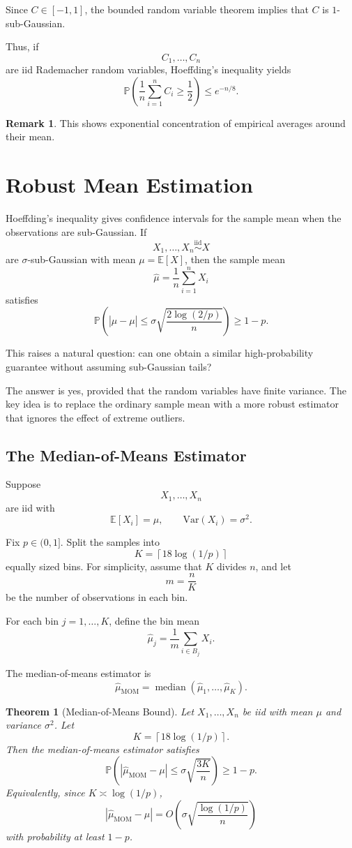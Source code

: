 \documentclass[12pt,oneside]{book}
\numberwithin{equation}{section}
\theoremstyle{definition}
\newtheorem{remark}{Remark}[section]
\theoremstyle{plain}
\newtheorem{theorem}{Theorem}[section]
\theoremstyle{remark}
\newcommand{\E}{\mathbb{E}}
\newcommand{\Var}{\mathrm{Var}}
\newcommand{\Prob}{\mathbb{P}}
\newcommand{\iid}{\overset{\text{iid}}{\sim}}
\begin{document}
Since $C\in[-1,1]$, the bounded random variable theorem implies that $C$ is $1$-sub-Gaussian.

Thus, if
\[
C_1,\dots,C_n
\]
are iid Rademacher random variables, Hoeffding's inequality yields
\[
\Prob\left(
\frac{1}{n}\sum_{i=1}^n C_i
\geq
\frac12
\right)
\leq
e^{-n/8}.
\]

\begin{remark}
This shows exponential concentration of empirical averages around their mean.
\end{remark}

\section{Robust Mean Estimation}

Hoeffding's inequality gives confidence intervals for the sample mean when the observations are sub-Gaussian. If
\[
X_1,\dots,X_n \iid X
\]
are $\sigma$-sub-Gaussian with mean $\mu=\E[X]$, then the sample mean
\[
\widehat{\mu}
=
\frac{1}{n}\sum_{i=1}^n X_i
\]
satisfies
\[
\Prob\left(
|\widehat{\mu}-\mu|
\leq
\sigma\sqrt{\frac{2\log(2/p)}{n}}
\right)
\geq
1-p.
\]

This raises a natural question: can one obtain a similar high-probability guarantee without assuming sub-Gaussian tails?

The answer is yes, provided that the random variables have finite variance. The key idea is to replace the ordinary sample mean with a more robust estimator that ignores the effect of extreme outliers.

\subsection{The Median-of-Means Estimator}

Suppose
\[
X_1,\dots,X_n
\]
are iid with
\[
\E[X_i]=\mu,
\qquad
\Var(X_i)=\sigma^2.
\]

Fix $p\in(0,1]$. Split the samples into
\[
K=\left\lceil 18\log(1/p)\right\rceil
\]
equally sized bins. For simplicity, assume that $K$ divides $n$, and let
\[
m=\frac{n}{K}
\]
be the number of observations in each bin.

For each bin $j=1,\dots,K$, define the bin mean
\[
\widehat{\mu}_j
=
\frac{1}{m}
\sum_{i\in B_j} X_i.
\]

The median-of-means estimator is
\[
\widehat{\mu}_{\mathrm{MOM}}
=
\operatorname{median}
\left(
\widehat{\mu}_1,\dots,\widehat{\mu}_K
\right).
\]

\begin{theorem}[Median-of-Means Bound]
Let $X_1,\dots,X_n$ be iid with mean $\mu$ and variance $\sigma^2$. Let
\[
K=\left\lceil 18\log(1/p)\right\rceil.
\]
Then the median-of-means estimator satisfies
\[
\Prob\left(
|\widehat{\mu}_{\mathrm{MOM}}-\mu|
\leq
\sigma\sqrt{\frac{3K}{n}}
\right)
\geq
1-p.
\]
Equivalently, since $K\asymp \log(1/p)$,
\[
|\widehat{\mu}_{\mathrm{MOM}}-\mu|
=
O\left(
\sigma\sqrt{\frac{\log(1/p)}{n}}
\right)
\]
with probability at least $1-p$.
\end{theorem}
\end{document}

